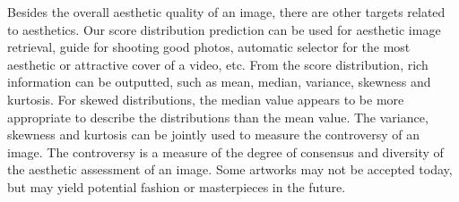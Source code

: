 \documentclass[letterpaper]{article} %
\begin{document}
Besides the overall aesthetic quality of an image, there are other targets related to aesthetics. Our score distribution prediction can be used for aesthetic image retrieval, guide for shooting good photos, automatic selector for the most aesthetic or attractive cover of a video, etc. From the score distribution, rich information can be outputted, such as mean, median, variance, skewness and kurtosis. For skewed distributions, the median value appears to be more appropriate to describe the distributions than the mean value. The variance, skewness and kurtosis can be jointly used to measure the controversy of an image. The controversy is a measure of the degree of consensus and diversity of the aesthetic assessment of an image. Some artworks may not be accepted today, but may yield potential fashion or masterpieces in the future.




%


%

\end{document}
